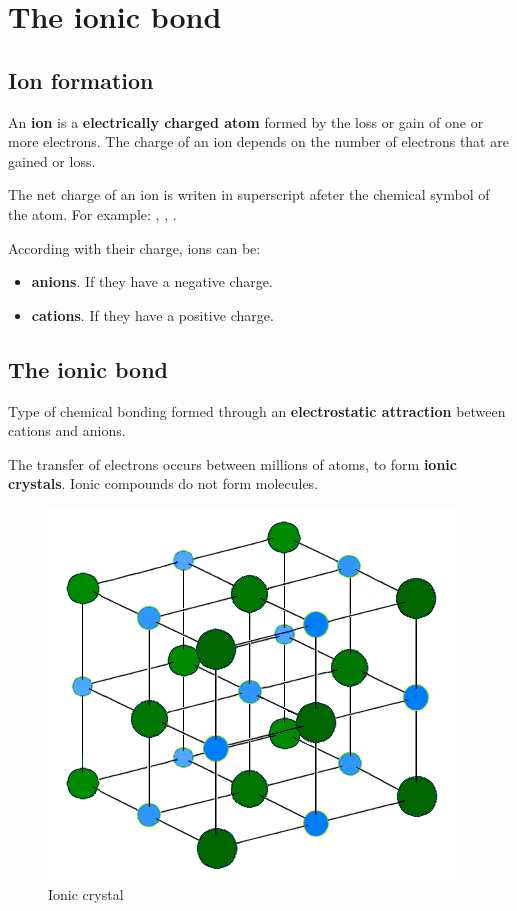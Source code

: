 \documentclass{article}
\begin{document}
	\section{The ionic bond}
		
		\subsection{Ion formation}
			An \textbf{ion} is a \textbf{electrically charged atom} formed by the loss 
			or gain of one or more electrons. The charge of an ion depends on the number of electrons that 
			are gained or loss.

			The net charge of an ion is writen in superscript afeter the chemical symbol of the atom.
			For example: , , .

			According with their charge, ions can be:

			\begin{itemize}
				\item \textbf{anions}. If they have a negative charge.
				\item \textbf{cations}. If they have a positive charge.
			\end{itemize}

		\subsection{The ionic bond}
			Type of chemical bonding formed through an \textbf{electrostatic attraction} 
			between cations and anions.

			The transfer of electrons occurs between millions of atoms, to form \textbf{ionic crystals}. 
			Ionic compounds do not form molecules.

			\begin{figure}[htp]
				\centering
				\includegraphics{ionic_crystal.png}
				\caption{Ionic crystal}
			\end{figure}
				
\end{document}
